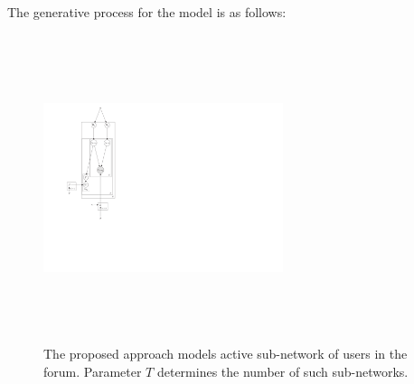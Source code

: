 \documentclass{sig-alternate}
\begin{document}
The generative process for the model is as follows:

\begin{figure}
\centering
\includegraphics[height=9cm,width=7cm]{pgm_ThreadBased.pdf}
\caption{The proposed approach models active sub-network of users in the forum.
Parameter $T$ determines the number of such sub-networks.
}
\label{fig:finalThreadAggregationModel}
\end{figure}
\end{document}
